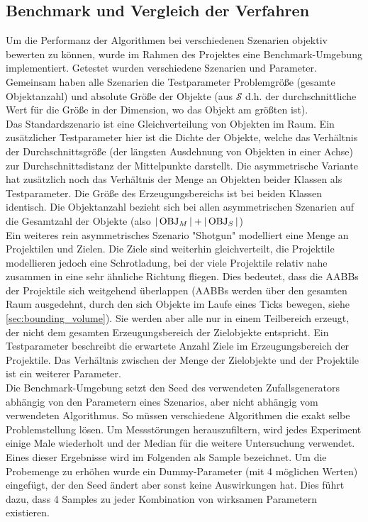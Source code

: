\subsection{Benchmark und Vergleich der Verfahren}
\label{sec:benchmark}
Um die Performanz der Algorithmen bei verschiedenen Szenarien objektiv bewerten zu können, wurde im Rahmen des Projektes eine Benchmark-Umgebung implementiert. Getestet wurden verschiedene Szenarien und Parameter. Gemeinsam haben alle Szenarien die Testparameter Problemgröße (gesamte Objektanzahl) und absolute Größe der Objekte (aus $\mathcal{S}$ d.h. der durchschnittliche Wert für die Größe in der Dimension, wo das Objekt am größten ist).\\

Das Standardszenario ist eine Gleichverteilung von Objekten im Raum. 
Ein zusätzlicher Testparameter hier ist die Dichte der Objekte, welche das Verhältnis der Durchschnittsgröße (der längsten Ausdehnung von Objekten in einer
 Achse) zur Durchschnittsdistanz der Mittelpunkte darstellt. Die asymmetrische Variante hat zusätzlich noch das Verhältnis der Menge an Objekten beider Klassen als Testparameter. Die Größe des Erzeugungsbereichs ist bei beiden Klassen identisch. Die Objektanzahl bezieht sich bei allen asymmetrischen Szenarien auf die Gesamtzahl der Objekte (also $|\operatorname{OBJ}_M| + |\operatorname{OBJ}_S|$)\\
Ein weiteres rein asymmetrisches Szenario "Shotgun" modelliert eine Menge an Projektilen und Zielen. Die Ziele sind weiterhin gleichverteilt, die Projektile modellieren jedoch eine Schrotladung, bei der viele Projektile relativ nahe zusammen in eine sehr ähnliche Richtung fliegen. Dies bedeutet, dass die AABBs der Projektile sich weitgehend überlappen (AABBs werden über den gesamten Raum ausgedehnt, durch den sich Objekte im Laufe eines Ticks bewegen, siehe \ref{sec:bounding_volume}). Sie werden aber alle nur in einem Teilbereich erzeugt, der nicht dem gesamten Erzeugungsbereich der Zielobjekte entspricht. Ein Testparameter beschreibt die erwartete Anzahl Ziele im Erzeugungsbereich der Projektile. Das Verhältnis zwischen der Menge der Zielobjekte und der Projektile ist ein weiterer Parameter.\\
Die Benchmark-Umgebung setzt den Seed des verwendeten Zufallsgenerators abhängig von den Parametern eines Szenarios, aber nicht abhängig vom verwendeten Algorithmus. So müssen verschiedene Algorithmen die exakt selbe Problemstellung lösen. Um Messstörungen herauszufiltern, wird jedes Experiment einige Male wiederholt und der Median für die weitere Untersuchung verwendet. Eines dieser Ergebnisse wird im Folgenden als Sample bezeichnet. Um die Probemenge zu erhöhen wurde ein Dummy-Parameter (mit 4 möglichen Werten) eingefügt, der den Seed ändert aber sonst keine Auswirkungen hat. Dies führt dazu, dass 4 Samples zu jeder Kombination von wirksamen Parametern existieren.\\
